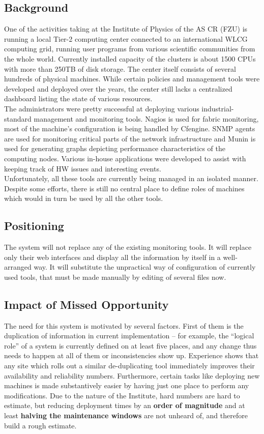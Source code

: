 \documentclass[12pt]{article}
\begin{document}
\subsection{Background}
One of the activities taking at the Institute of Physics of the AS CR (FZU) is running a local Tier-2 computing center connected to 
an international WLCG computing grid, running user programs from various scientific communities from the whole world. Currently 
installed capacity of the clusters is about 1500 CPUs with more than 250TB of disk storage. The center itself consists of several 
hundreds of physical machines. While certain policies and management tools were developed and deployed over the years, the center 
still lacks a centralized dashboard listing the state of various resources.\\
The administrators were pretty successful at deploying various industrial-standard management and monitoring tools. Nagios is used 
for fabric monitoring, most of the machine's configuration is being handled by Cfengine. SNMP agents are used for monitoring 
critical parts of the network infrastructure and Munin is used for generating graphs depicting performance characteristics of the 
computing nodes. Various in-house applications were developed to assist with keeping track of HW issues and interesting events.\\
Unfortunately, all these tools are currently being managed in an isolated manner. Despite some efforts, there is still no central 
place to define roles of machines which would in turn be used by all the other tools.

 
\subsection{Positioning}
The system will not replace any of the existing monitoring tools. It will replace only their web interfaces and display all the 
information by itself in a well-arranged way. It will substitute the unpractical way of configuration of currently used tools, 
that must be made manually by editing of several files now.

\subsection{Impact of Missed Opportunity}
The need for this system is motivated by several factors.  First of them is the duplication of information in current
implementation -- for example, the ``logical role'' of a system is currently defined on at least five places, and any change thus
needs to happen at all of them or inconsistencies show up.  Experience shows that any site which rolls out a similar
de-duplicating tool immediately improves their availability and reliability numbers.  Furthermore, certain tasks like deploying
new machines is made substantively easier by having just one place to perform any modifications.  Due to the nature of the
Institute, hard numbers are hard to estimate, but reducing deployment times by an {\bf order of magnitude} and at least {\bf
halving the maintenance windows} are not unheard of, and therefore build a rough estimate.
\end{document}
